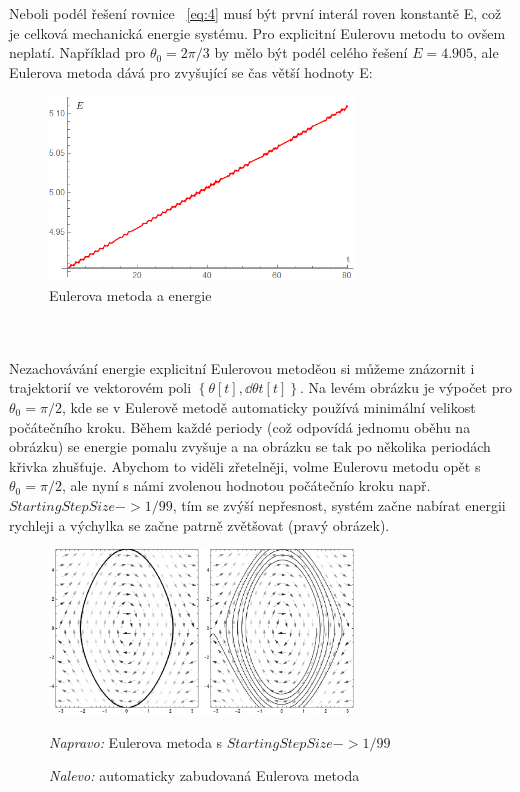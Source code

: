 \documentclass[reqno, a4paper]{amsart}
\begin{document}
Neboli podél řešení rovnice ~\eqref{eq:4} musí být první interál roven konstantě E, což je celková mechanická energie systému.
Pro explicitní Eulerovu metodu to ovšem neplatí. Například pro $\theta_{0} =2\pi/3$ by mělo být podél celého řešení $E=4.905$, ale Eulerova metoda dává pro zvyšující se čas větší hodnoty E:
\begin{figure}[h]
	\centering
	\includegraphics[width=0.72\textwidth]{energie}
	\caption*{Eulerova metoda a energie}  
\end{figure}
\\
\\
Nezachovávání energie explicitní Eulerovou metoděou si můžeme znázornit i trajektorií ve vektorovém poli ${\left\lbrace \theta[t],\dd{\theta}{t}[t]\right\rbrace }$. Na levém obrázku je výpočet pro $\theta_{0}=\pi/2$, kde se v Eulerově metodě automaticky používá minimální velikost počátečního kroku. Během každé periody (což odpovídá jednomu oběhu na obrázku) se energie pomalu zvyšuje a na obrázku se tak po několika periodách křivka zhušťuje. Abychom to viděli zřetelněji, volme Eulerovu metodu opět s $\theta_{0}=\pi/2$, ale nyní s námi zvolenou hodnotou počátečnío kroku např. $ StartingStepSize -> 1/99 $, tím se zvýší nepřesnost, systém začne nabírat energii rychleji a výchylka se začne patrně zvětšovat (pravý obrázek).
\begin{figure}[h]
	\centering
	\includegraphics[width=0.72\textwidth]{pole1}
	\caption*{\textit{Nalevo:} automaticky zabudovaná Eulerova metoda}  \textit{Napravo:} Eulerova metoda s $StartingStepSize -> 1/99$  
\end{figure}
\end{document}
